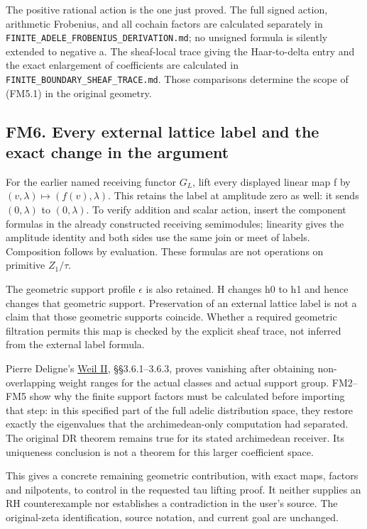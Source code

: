 The positive rational action is the one just proved. The full signed
action, arithmetic Frobenius, and all cochain factors are calculated
separately in \nolinkurl{FINITE_ADELE_FROBENIUS_DERIVATION.md}; no unsigned
formula is silently extended to negative a. The sheaf-local trace giving
the Haar-to-delta entry and the exact enlargement of coefficients are
calculated in \nolinkurl{FINITE_BOUNDARY_SHEAF_TRACE.md}. Those comparisons
determine the scope of (FM5.1) in the original geometry.

\subsection{FM6. Every external lattice label and the exact change in
the
argument}\label{fm6.-every-external-lattice-label-and-the-exact-change-in-the-argument}

For the earlier named receiving functor \(G_L\), lift every displayed
linear map f by \((v,\lambda)\mapsto(f(v),\lambda)\). This retains the
label at amplitude zero as well: it sends \((0,\lambda)\) to
\((0,\lambda)\). To verify addition and scalar action, insert the
component formulas in the already constructed receiving semimodules;
linearity gives the amplitude identity and both sides use the same join
or meet of labels. Composition follows by evaluation. These formulas are
not operations on primitive \(Z_1/\tau\).

The geometric support profile \(\epsilon\) is also retained. H changes
h0 to h1 and hence changes that geometric support. Preservation of an
external lattice label is not a claim that those geometric supports
coincide. Whether a required geometric filtration permits this map is
checked by the explicit sheaf trace, not inferred from the external
label formula.

Pierre Deligne's
\href{https://www.numdam.org/item/PMIHES_1980__52__137_0/}{Weil II},
§§3.6.1--3.6.3, proves vanishing after obtaining non-overlapping weight
ranges for the actual classes and actual support group. FM2--FM5 show
why the finite support factors must be calculated before importing that
step: in this specified part of the full adelic distribution space, they
restore exactly the eigenvalues that the archimedean-only computation
had separated. The original DR theorem remains true for its stated
archimedean receiver. Its uniqueness conclusion is not a theorem for
this larger coefficient space.

This gives a concrete remaining geometric contribution, with exact maps,
factors and nilpotents, to control in the requested tau lifting proof.
It neither supplies an RH counterexample nor establishes a contradiction
in the user's source. The original-zeta identification, source notation,
and current goal are unchanged.

